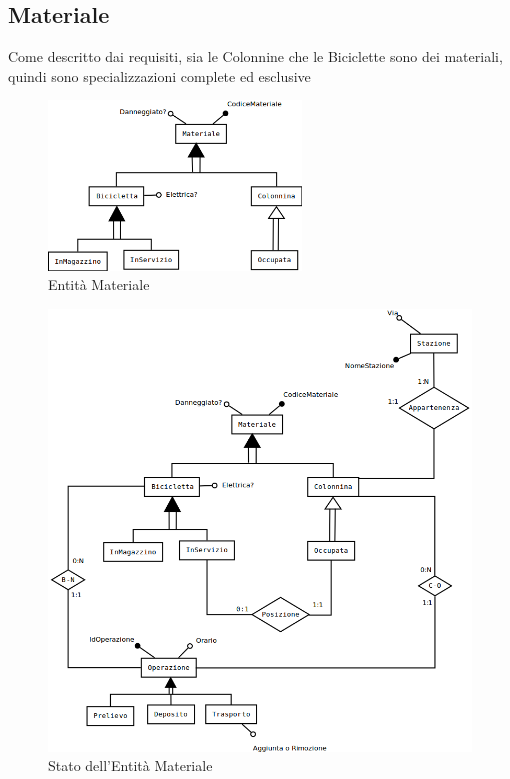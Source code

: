 \documentclass[a4paper,twoside]{article}
\begin{document}
\subsection{Materiale}
Come descritto dai requisiti, sia le Colonnine che le Biciclette sono dei materiali, quindi sono specializzazioni complete ed esclusive
\begin{figure}[H]
 \centering
  \includegraphics[width=0.6\textwidth]{Concettuale12}
\caption{Entità Materiale}
\end{figure}
\begin{figure}[H]
 \centering
  \includegraphics[width=1\textwidth]{Concettuale13}
\caption{Stato dell'Entità Materiale}
\end{figure}
\end{document}
